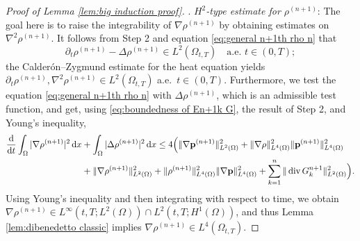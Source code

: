 \documentclass[11pt,a4paper,reqno]{amsart}
\theoremstyle{remark}
\theoremstyle{definition}
\numberwithin{equation}{section}
\DeclareMathOperator{\dv}{div}
\newcommand{\p}{{\bf p}}
\renewcommand{\d}{\, \mathrm{d} }
\newcommand{\der}{\mathrm{d}}
\begin{document}
\begin{proof}[Proof of Lemma \ref{lem:big induction proof}]
\smallskip 

. \textit{$H^2$-type estimate for $\rho^{(n+1)}$}: The goal here is to raise the integrability of $\nabla \rho^{(n+1)}$ by obtaining estimates on $\nabla^2 \rho^{(n+1)}$. It follows from Step 2 and equation \eqref{eq:general n+1th rho n} that 
\begin{equation*}
    \partial_t \rho^{(n+1)} - \Delta \rho^{(n+1)} \in L^2(\Omega_{t,T}) \quad \text{a.e.~} t \in (0,T); 
\end{equation*}
the Calder\'on--Zygmund estimate for the heat equation yields $\partial_t \rho^{(n+1)}, \nabla^2 \rho^{(n+1)} \in L^2(\Omega_{t,T})$ a.e.~$t \in (0,T).$ Furthermore, we test the equation \eqref{eq:general n+1th rho n} with $\Delta \rho^{(n+1)}$, which is an admissible test function, and get, using \eqref{eq:boundedness of En+1k G}, the result of Step 2, and Young's inequality, 
\begin{equation*}
    \begin{aligned}    
        \frac{\der}{\der t}\int_\Omega |\nabla \rho^{(n+1)}|^2 \d x &+ \int_\Omega |\Delta \rho^{(n+1)}|^2 \d x \leq 4\Big( \Vert \nabla \p^{(n+1)}\Vert_{L^2(\Omega)}^2 + \Vert \nabla \rho \Vert^2_{L^4(\Omega)}\Vert \p^{(n+1)}\Vert^2_{L^4(\Omega)}\\ 
        &+ \Vert \nabla \rho^{(n+1)} \Vert^2_{L^2(\Omega)} + \Vert \rho^{(n+1)}\Vert^2_{L^4(\Omega)}\Vert \nabla \p \Vert^2_{L^4(\Omega)} + \sum_{k=1}^n \Vert \dv G^{n+1}_k \Vert^2_{L^2(\Omega)} \Big). 
    \end{aligned}
\end{equation*}
Using Young's inequality and then integrating with respect to time, we obtain $\nabla \rho^{(n+1)} \in L^\infty(t,T;L^2(\Omega)) \cap L^2(t,T;H^1(\Omega))$, and thus Lemma \ref{lem:dibenedetto classic} implies $\nabla \rho^{(n+1)} \in L^4(\Omega_{t,T})$. 

\smallskip 


\end{proof}
\end{document}
